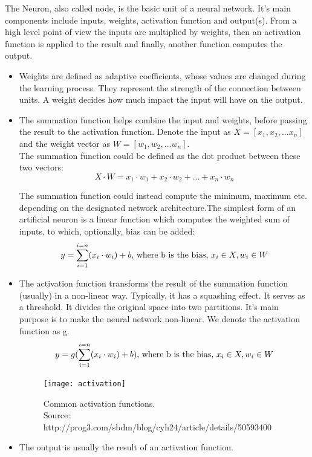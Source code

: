 The Neuron, also called node, is the basic unit of a neural network. It's main components include inputs,
weights, activation function and output(s). From a high level point of view the inputs are multiplied by 
weights, then an activation function is applied to the result and finally, another function computes the output\cite{REF:12}\cite{REF:13}. \par


\begin{itemize}
	\item Weights are defined as adaptive coefficients, whose values are changed during the learning process. They represent the strength of the connection between units. A weight decides how much impact the input will have on the output.
	
	\item The summation function helps combine the input and weights, before passing the result to the activation function. Denote the input as $X = [x_1, x_2, ...x_n]$ and the weight vector as $W = [w_1, w_2, ...w_n]$.\\
	The summation function could be defined as the dot product between these two vectors:\\
	\begin{equation}
	X \cdot W =x_1 \cdot w_1 +x_2 \cdot w_2 +...+x_n \cdot w_n
	\end{equation}

	
	The summation function could instead compute the minimum, maximum etc. depending on the designated network architecture.The simplest form of an artificial neuron is a linear function which computes the weighted sum of inputs, to which, optionally, bias can be added:
	\begin{equation}
		y = \sum_{i=1}^{i=n}(x_i \cdot w_i) + b \textnormal{, where b is the bias, $x_i \in X, w_i \in W$}
	\end{equation}

	
	\item The activation function transforms the result of the summation function (usually) in a non-linear way. Typically, it has a squashing effect. It serves as a threshold. It divides the original space into two partitions. It's main purpose is to make the neural network non-linear. We denote the activation function as g.
	\begin{equation}
		y = g(\sum_{i=1}^{i=n}(x_i \cdot w_i) + b) \textnormal{, where b is the bias, $x_i \in X, w_i \in W$}
	\end{equation}

	
	\begin{figure}[h]
		\caption[Common activation functions]{Common activation functions.\\
			Source: http://prog3.com/sbdm/blog/cyh24/article/details/50593400 }
		\centering
		\texttt{[image: activation]}
	\end{figure}
	\item The output is usually the result of an activation function.
	
\end{itemize}

